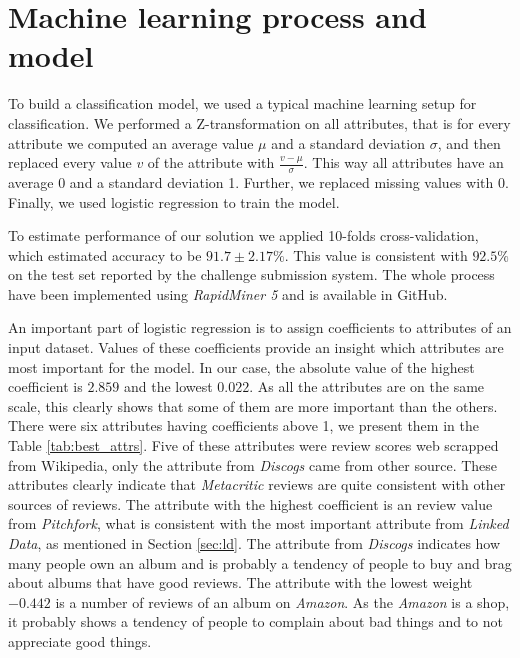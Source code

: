 \documentclass{llncs}
\begin{document}
\section{Machine learning process and model\label{sec:ml}}

To build a classification model, we used a typical machine learning setup for classification.
We performed a Z-transformation on all attributes, that is for every attribute we computed an average value $\mu$ and a standard deviation $\sigma$, and then replaced every value $v$ of the attribute with $\frac{v-\mu}{\sigma}$.
This way all attributes have an average 0 and a standard deviation 1.
Further, we replaced missing values with 0.
Finally, we used logistic regression \cite{logistic_regression} to train the model.

To estimate performance of our solution we applied 10-folds cross-validation, which estimated accuracy to be $91.7\pm 2.17\%$.
This value is consistent with $92.5\%$ on the test set reported by the challenge submission system.
The whole process have been implemented using \emph{RapidMiner 5} and is available in GitHub.

An important part of logistic regression is to assign coefficients to attributes of an input dataset.
Values of these coefficients provide an insight which attributes are most important for the model.
In our case, the absolute value of the highest coefficient is $2.859$ and the lowest $0.022$.
As all the attributes are on the same scale, this clearly shows that some of them are more important than the others.
There were six attributes having coefficients above 1, we present them in the Table \ref{tab:best_attrs}.
Five of these attributes were review scores web scrapped from Wikipedia, only the attribute from \emph{Discogs} came from other source.
These attributes clearly indicate that \emph{Metacritic} reviews are quite consistent with other sources of reviews.
The attribute with the highest coefficient is an review value from \emph{Pitchfork}, what is consistent with the most important attribute from \emph{Linked Data}, as mentioned in Section \ref{sec:ld}.
The attribute from \emph{Discogs} indicates how many people own an album and is probably a tendency of people to buy and brag about albums that have good reviews.
The attribute with the lowest weight $-0.442$ is a number of reviews of an album on \emph{Amazon}.
As the \emph{Amazon} is a shop, it probably shows a tendency of people to complain about bad things and to not appreciate good things.
\end{document}
